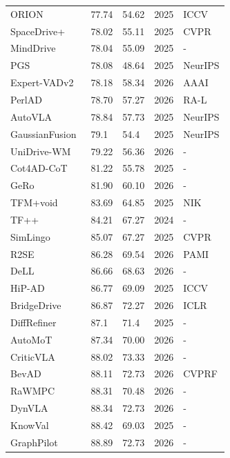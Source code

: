 \documentclass[10pt,twocolumn,letterpaper]{article}
\begin{document}
\begin{table}[t]
\begin{tabular}{l|ll|ll}
ORION~\cite{Fu2025ICCV} & 77.74 & 54.62 & 2025 & ICCV \\
SpaceDrive+~\cite{Li2025ARXIVc} & 78.02 & 55.11 & 2025 & CVPR \\
MindDrive~\cite{Fu2025ARXIV} & 78.04 & 55.09 & 2025 & - \\
PGS~\cite{Huang2025NEURIPS} & 78.08 & 48.64 & 2025 & NeurIPS \\
Expert-VADv2~\cite{Jiang2026AAAI} & 78.18 & 58.34 & 2026 & AAAI \\
PerlAD~\cite{Gao20262ARXIV} & 78.70 & 57.27 & 2026 & RA-L \\
AutoVLA~\cite{Zhou2025NEURIPS} & 78.84 & 57.73 & 2025 & NeurIPS \\
GaussianFusion~\cite{Liu2025NEURIPS} & 79.1 & 54.4 & 2025 & NeurIPS \\
UniDrive-WM \cite{Xiong2026ARXIV} & 79.22 & 56.36 & 2026 & - \\
Cot4AD-CoT\cite{Wang2025ARXIVc} & 81.22 & 55.78 & 2025 & - \\
GeRo\cite{Yasarla2026ARXIV} & 81.90 & 60.10 & 2026 & - \\
TFM+void~\cite{Winje2025NIK} & 83.69 & 64.85 & 2025 & NIK \\
TF++~\cite{Zimmerlin2024ArXiv} & 84.21 & 67.27 & 2024 & - \\
SimLingo~\cite{Renz2025CVPR} & 85.07 & 67.27 & 2025 & CVPR \\
R2SE~\cite{Liu2026PAMI} & 86.28 & 69.54 & 2026 & PAMI \\
DeLL~\cite{Du2026ARXIV} & 86.66 & 68.63 & 2026 & - \\
HiP-AD~\cite{Tang2025ICCV} & 86.77 & 69.09 & 2025 & ICCV \\
BridgeDrive~\cite{Liu2026ICLR} & 86.87 & 72.27 & 2026 & ICLR \\
DiffRefiner~\cite{Yin2025ARXIV} & 87.1 & 71.4 & 2025 & - \\
AutoMoT~\cite{Huang2026ARXIV} & 87.34 & 70.00 & 2026 & - \\
CriticVLA~\cite{Yang2026ARXIV} & 88.02 & 73.33 & 2026 & - \\
BevAD~\cite{Holtz2026CVPR} & 88.11 & 72.73 & 2026 & CVPRF \\
RaWMPC~\cite{Sun2026ARXIV} & 88.31 & 70.48 & 2026 & - \\
DynVLA~\cite{Shang2026ARXIV} & 88.34 & 72.73 & 2026 & - \\
KnowVal~\cite{Xia2025ARXIV} & 88.42 & 69.03 & 2025 & - \\
GraphPilot~\cite{Schmidt2025ARXIV} & 88.89 & 72.73 & 2026 & - \\

\end{tabular}
\end{table}
\end{document}
